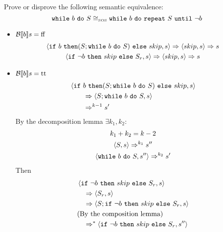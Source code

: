 \begin{exercise}{
    Prove or disprove the following semantic equivalence:
    \[ \texttt{while}\ b\ \texttt{do}\ S \cong_{\text{\tiny SOS}} \texttt{while}\ b\ \texttt{do}\ \texttt{repeat}\ S\ \texttt{until}\ \neg b  \]\vspace*{-0.6cm}
}
\begin{itemize}
\begin{itemize}
\begin{itemize}
                    \item $\mathcal{B} \llbracket  b \rrbracket s = \text{ff}$
                    \begin{gather*}
                        \instr{\texttt{if}\ b\ \texttt{then} (S; \wwhile{b}{S})\ \texttt{else}\ skip}{s}
                        \Rightarrow
                        \instr{skip}{s}
                        \Rightarrow s
                        \\
                        \instr{\texttt{if}\ \neg b\ \texttt{then}\ skip\ \texttt{else}\ S_r}{s}
                        \Rightarrow
                        \instr{skip}{s}
                        \Rightarrow s
                    \end{gather*}
                    \item $\mathcal{B} \llbracket  b \rrbracket s = \text{tt}$
                        \begin{align*}
                            &\left<\texttt{if}\ b\ \texttt{then} (S; \texttt{while}\ b\ \texttt{do}\ S)\ \texttt{else}\ skip, s\right>
                            \\&\qquad\Rightarrow \left<S; \texttt{while}\ b\ \texttt{do}\ S, s\right>
                            \\&\qquad\Rightarrow^{k-1} s'
                        \end{align*}
                        By the decomposition lemma $\exists k_1, k_2 :$
                        \begin{gather*}
                            k_1 + k_2 = k - 2 \\
                            \left<S, s\right> \Rightarrow^{k_1} s'' \\
                            \left<\texttt{while}\ b\ \texttt{do}\ S, s''\right> \Rightarrow^{k_2} s'
                        \end{gather*}
                        Then
                        \begin{align*}
                            &\instr{\texttt{if}\ \neg b\ \texttt{then}\ skip\ \texttt{else}\ S_r}{s}
                            \\&\quad\Rightarrow \instr{S_r}{s}
                            \\&\quad\Rightarrow \instr{S; \texttt{if}\ \neg b\ \texttt{then}\ skip\ \texttt{else}\ S_r}{s}
                            \\&\text{(By the composition lemma)}
                            \\&\quad\Rightarrow^* \instr{\texttt{if}\ \neg b\ \texttt{then}\ skip\ \texttt{else}\ S_r}{s''}
                        \end{align*}

\end{itemize}
\end{itemize}
\end{itemize}
\end{exercise}

